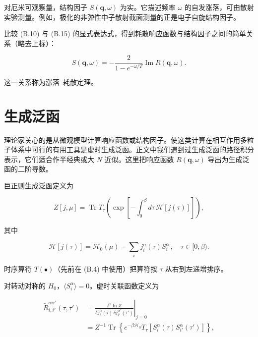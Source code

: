 对厄米可观察量，结构因子 $S(\mathbf{q},\omega)$ 为实。它描述频率 $\omega$ 的自发涨落，可由散射实验测量。例如，极化的非弹性中子散射截面测量的正是电子自旋结构因子。

比较 (B.10) 与 (B.15) 的显式表达式，得到耗散响应函数与结构因子之间的简单关系（略去上标）：

\begin{equation*}
S ( \mathbf {q}, \omega ) = - \frac {2}{1 - e ^ {- \omega /T}} \operatorname{Im} R ( \mathbf {q}, \omega ).
\tag{B.16}
\end{equation*}

这一关系称为涨落--耗散定理。

\section{生成泛函}

理论家关心的是从微观模型计算响应函数或结构因子。使这类计算在相互作用多粒子体系中可行的有用工具是虚时生成泛函。正文中我们遇到过生成泛函的路径积分表示，它们适合作半经典或大 $N$ 近似。这里把响应函数 $R(\mathbf{q},\omega)$ 导出为生成泛函的二阶导数。

巨正则生成泛函定义为

\begin{equation*}
Z [ j, \mu ] = \operatorname{Tr} T _ {\tau} \left( \exp \left[ - \int_ {0} ^ {\beta} d \tau \, \mathcal {H} [ j ( \tau ) ] \right] \right) ,
\tag{B.17}
\end{equation*}

其中

\begin{equation*}
\mathcal {H} [ j ( \tau ) ] = \mathcal {H} _ {0} ( \mu ) - \sum_ {i} j _ {i} ^ {\alpha} ( \tau ) S _ {i} ^ {\alpha} \, , \quad \tau \in [ 0, \beta ).
\tag{B.18}
\end{equation*}

时序算符 $T(\bullet)$（先前在 (B.4) 中使用）把算符按 $\tau$ 从右到左递增排序。

对转动对称的 $H_{0}$，$\langle S_{i}^{\alpha}\rangle = 0$。虚时关联函数定义为

\begin{align*}
\tilde {R}_{i, i'} ^ {\alpha \alpha'} ( \tau, \tau ' ) & = \left. \frac {\delta^ {2} \ln Z}{\delta j_{i} ^ {\alpha} ( \tau ) \, \delta j_{i'} ^ {\alpha'} ( \tau ' )} \right| _ {j = 0}\\
& = Z ^ {- 1} \operatorname{Tr} \left\{ e ^ {- \beta \mathcal {H} _ {0}} T _ {\tau} \left[ S _ {i} ^ {\alpha} ( \tau ) S _ {i'} ^ {\alpha} ( \tau ' ) \right] \right\} ,
\tag{B.19}
\end{align*}

